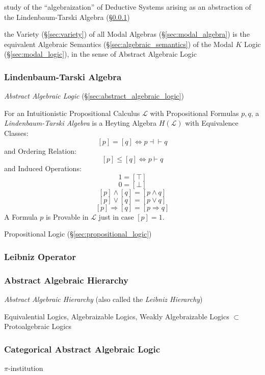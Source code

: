 study of the ``algebraization'' of Deductive Systems arising as an abstraction
of the Lindenbaum-Tarski Algebra (\S\ref{sec:lindenbaum_tarski})

the Variety (\S\ref{sec:variety}) of all Modal Algebras
(\S\ref{sec:modal_algebra}) is the equivalent Algebraic Semantics
(\S\ref{sec:algebraic_semantics}) of the Modal $K$ Logic
(\S\ref{sec:modal_logic}), in the sense of Abstract Algebraic Logic



\subsubsection{Lindenbaum-Tarski Algebra}\label{sec:lindenbaum_tarski}

\emph{Abstract Algebraic Logic} (\S\ref{sec:abstract_algebraic_logic})

\cite{awodey06}
For an Intuitionistic Propositional Calculus $\mathcal{L}$ with
Propositional Formulas $p,q$, a \emph{Lindenbaum-Tarski Algebra} is a
Heyting Algebra $H(\mathcal{L})$ with Equivalence Classes:
\[
  [p] = [q] \Leftrightarrow p \dashv \vdash q
\]
and Ordering Relation:
\[
  [p] \leq [q] \Leftrightarrow p \vdash q
\]
and Induced Operations:
\[
  1 = [\top]
\]\[
  0 = [\bot]
\]\[
  [p] \wedge [q] = [p \wedge q]
\]\[
  [p] \vee [q] = [p \vee q]
\]\[
  [p] \Rightarrow [q] = [p \Rightarrow q]
\]
A Formula $p$ is Provable in $\mathcal{L}$ just in case $[p] = 1$.

Propositional Logic (\S\ref{sec:propositional_logic})



\subsubsection{Leibniz Operator}\label{sec:leibniz_operator}

\subsubsection{Abstract Algebraic Hierarchy}\label{sec:leibniz_hierarchy}

\emph{Abstract Algebraic Hierarchy} (also called the \emph{Leibniz
  Hierarchy})

Equivalential Logics, Algebraizable Logics, Weakly Algebraizable
Logics $\subset$ Protoalgebraic Logics



\subsubsection{Categorical Abstract Algebraic Logic}
\label{sec:categorical_abstract}

$\pi$-institution
